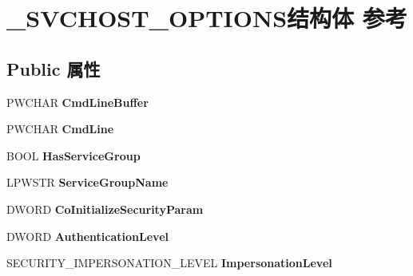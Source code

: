 \hypertarget{struct___s_v_c_h_o_s_t___o_p_t_i_o_n_s}{}\section{\+\_\+\+S\+V\+C\+H\+O\+S\+T\+\_\+\+O\+P\+T\+I\+O\+N\+S结构体 参考}
\label{struct___s_v_c_h_o_s_t___o_p_t_i_o_n_s}
\subsection*{Public 属性}
\begin{DoxyCompactItemize}
\item 
\mbox{\label{struct___s_v_c_h_o_s_t___o_p_t_i_o_n_s_ae7b5c97ad9c7dd77f35386e3cdb864f5}} 
P\+W\+C\+H\+AR {\bfseries Cmd\+Line\+Buffer}
\item 
\mbox{\label{struct___s_v_c_h_o_s_t___o_p_t_i_o_n_s_a9f2948673c72e8fd7fa73763b609c534}} 
P\+W\+C\+H\+AR {\bfseries Cmd\+Line}
\item 
\mbox{\label{struct___s_v_c_h_o_s_t___o_p_t_i_o_n_s_a4bb975ed748f8099f00ce0ff7831c101}} 
B\+O\+OL {\bfseries Has\+Service\+Group}
\item 
\mbox{\label{struct___s_v_c_h_o_s_t___o_p_t_i_o_n_s_a2ddd4e73b7b2716540b05ea4ae08ac80}} 
L\+P\+W\+S\+TR {\bfseries Service\+Group\+Name}
\item 
\mbox{\label{struct___s_v_c_h_o_s_t___o_p_t_i_o_n_s_abee638bb4c42af217f0bc193dc2e8437}} 
D\+W\+O\+RD {\bfseries Co\+Initialize\+Security\+Param}
\item 
\mbox{\label{struct___s_v_c_h_o_s_t___o_p_t_i_o_n_s_ae891852410aa7d984153ea8cc4c3dd7b}} 
D\+W\+O\+RD {\bfseries Authentication\+Level}
\item 
\mbox{\label{struct___s_v_c_h_o_s_t___o_p_t_i_o_n_s_a5afcc10ee505dc96978400da28786700}} 
S\+E\+C\+U\+R\+I\+T\+Y\+\_\+\+I\+M\+P\+E\+R\+S\+O\+N\+A\+T\+I\+O\+N\+\_\+\+L\+E\+V\+EL {\bfseries Impersonation\+Level}

\end{DoxyCompactItemize}
